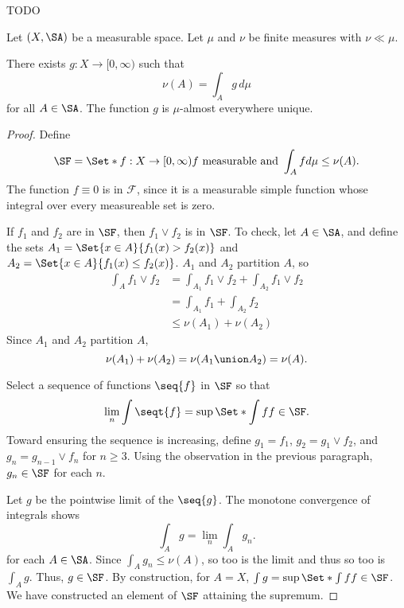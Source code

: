 \sbasic


\sstart



TODO



\begin{prop}
Let $(X, \SA)$
be a measurable space.
Let $\mu$ and $\nu$
be finite measures
with $\nu \ll \mu$.

There exists
$g: X \to [0, \infty)$
such that
\[
  \nu(A) = \int_A g \, d\mu
\]
for all $A \in \SA$.
The function $g$ is $\mu$-almost
everywhere unique.
\begin{proof}
  Define
  \[
    \SF = \Set*{
      f: X \to [0, \infty)
    }{
      f \text{ measurable and }
      \int_A f d\mu \leq \nu(A)
    }.
  \]
  The function $f \equiv 0$ is in $\mathcal{F}$,
  since it is a measurable simple function
  whose integral over every measureable set
  is zero.

  If $f_1$ and $f_2$ are in $\SF$,
  then $f_1 \vee f_2$ is in $\SF$.
  To check, let $A \in \SA$,
  and define the sets
  $A_1 = \Set{x \in A}{f_1(x) > f_2(x)}$
  and
  $A_2 = \Set{x \in A}{f_1(x) \leq f_2(x)}$.
  $A_1$ and $A_2$ partition $A$, so
  \[
    \begin{aligned}
    \int_A f_1 \vee f_2
      &=    \int_{A_1} f_1 \vee f_2 + \int_{A_2} f_1 \vee f_2 \\
      &=    \int_{A_1} f_1  + \int_{A_2} f_2 \\
      &\leq \nu(A_1) + \nu(A_2)
    \end{aligned}
  \]
  Since $A_1$ and $A_2$ partition
  $A$,
  \[
    \nu(A_1) + \nu(A_2) =
    \nu(A_1 \union A_2) =
    \nu(A).
  \]

  Select a sequence of
  functions $\seq{f}$ in $\SF$
  so that
  $$
    \lim_{n} \int \seqt{f} =
    \sup\Set*{\int f}{f \in \SF}.
  $$
  Toward ensuring the sequence
  is increasing, define
  $g_1 = f_1$, $g_2 = g_1 \vee f_2$,
  and $g_n = g_{n-1} \vee f_n$
  for $n \geq 3$.
  Using the observation in the previous
  paragraph, $g_n \in \SF$ for each $n$.

  Let $g$ be the pointwise limit
  of the $\seq{g}$.
  The monotone convergence
  of integrals shows
  \[
    \int_A g = \lim_n \int_A g_n.
  \]
  for each $A \in \SA$.
  Since $\int_A g_n \leq \nu(A)$,
  so too is the limit and thus
  so too is $\int_A g$.
  Thus, $g \in \SF$.
  By construction,
  for $A = X$,
  $\int g = \sup\Set*{\int f}{f \in \SF}$.
  We have constructed an element of $\SF$
  attaining the supremum.


\end{proof}
\end{prop}
